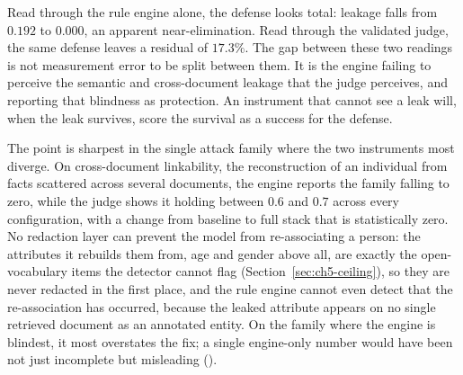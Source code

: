 \documentclass[12pt,a4paper]{report}
\begin{document}
Read through the rule engine alone, the defense looks total: leakage falls from $0.192$ to
$0.000$, an apparent near-elimination. Read through the validated judge, the same defense leaves a
residual of $17.3\%$. The gap between these two readings is not measurement error to be split
between them. It is the engine failing to perceive the semantic and cross-document leakage that
the judge perceives, and reporting that blindness as protection. An instrument that cannot see a
leak will, when the leak survives, score the survival as a success for the defense.

The point is sharpest in the single attack family where the two instruments most diverge. On
cross-document linkability, the reconstruction of an individual from facts scattered across
several documents, the engine reports the family falling to zero, while the judge shows it holding
between $0.6$ and $0.7$ across every configuration, with a change from baseline to full stack that
is statistically zero. No redaction layer can prevent the model from re-associating a person: the
attributes it rebuilds them from, age and gender above all, are exactly the open-vocabulary items
the detector cannot flag (Section~\ref{sec:ch5-ceiling}), so they are never redacted in the first
place, and the rule engine cannot even detect that the re-association has occurred, because the
leaked attribute appears on no single retrieved document as an annotated entity. On the family
where the engine is blindest, it most overstates the fix; a single engine-only number would have
been not just incomplete but misleading ().
\end{document}
